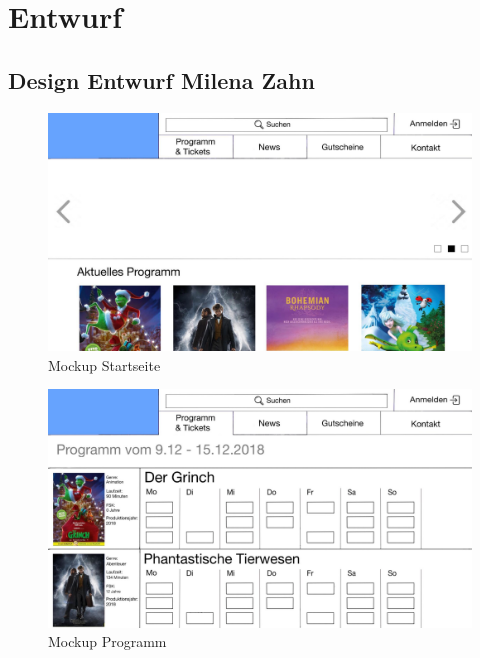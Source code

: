 \chapter{Entwurf}\label{entwurf}
	\section[Design Entwurf]{Design Entwurf {\hfill \normalsize Milena Zahn}}	
		\begin{figure}[H]
			\centering 
			\includegraphics[width=14cm]{img/mockUp1.png}
			\captionsetup{format=hang}
			\caption[Mockup Startseite]{\label{fig:mockUpStartseite} Mockup Startseite }
		\end{figure}
		\begin{figure}[H]
			\centering 
			\includegraphics[width=14cm]{img/mockUp2.png}
			\captionsetup{format=hang}
			\caption[Mockup Programm]{\label{fig:mockUpProgramm} Mockup Programm }
		\end{figure}
